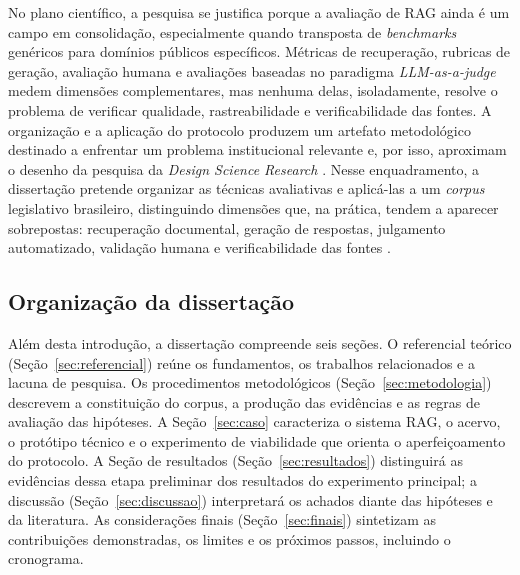 No plano científico, a pesquisa se justifica porque a avaliação de RAG ainda é um campo em consolidação, especialmente quando transposta de \textit{benchmarks} genéricos para domínios públicos específicos. Métricas de recuperação, rubricas de geração, avaliação humana e avaliações baseadas no paradigma \textit{LLM-as-a-judge} medem dimensões complementares, mas nenhuma delas, isoladamente, resolve o problema de verificar qualidade, rastreabilidade e verificabilidade das fontes. A organização e a aplicação do protocolo produzem um artefato metodológico destinado a enfrentar um problema institucional relevante e, por isso, aproximam o desenho da pesquisa da \textit{Design Science Research} \parencite{hevnerEtAl2004designScience,peffersEtAl2007dsrm}. Nesse enquadramento, a dissertação pretende organizar as técnicas avaliativas e aplicá-las a um \textit{corpus} legislativo brasileiro, distinguindo dimensões que, na prática, tendem a aparecer sobrepostas: recuperação documental, geração de respostas, julgamento automatizado, validação humana e verificabilidade das fontes \parencite{esEtAl2023ragas,saadFalconEtAl2024ares,pipitoneAlami2024legalbenchRag}.

\subsection{Organização da dissertação}

Além desta introdução, a dissertação compreende seis seções. O referencial teórico (Seção~\ref{sec:referencial}) reúne os fundamentos, os trabalhos relacionados e a lacuna de pesquisa. Os procedimentos metodológicos (Seção~\ref{sec:metodologia}) descrevem a constituição do corpus, a produção das evidências e as regras de avaliação das hipóteses. A Seção~\ref{sec:caso} caracteriza o sistema RAG, o acervo, o protótipo técnico e o experimento de viabilidade que orienta o aperfeiçoamento do protocolo. A Seção de resultados (Seção~\ref{sec:resultados}) distinguirá as evidências dessa etapa preliminar dos resultados do experimento principal; a discussão (Seção~\ref{sec:discussao}) interpretará os achados diante das hipóteses e da literatura. As considerações finais (Seção~\ref{sec:finais}) sintetizam as contribuições demonstradas, os limites e os próximos passos, incluindo o cronograma.


